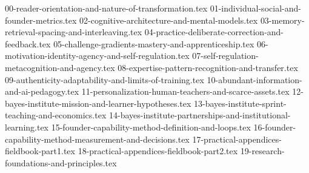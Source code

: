 
{00-reader-orientation-and-nature-of-transformation.tex}
{01-individual-social-and-founder-metrics.tex}
{02-cognitive-architecture-and-mental-models.tex}
{03-memory-retrieval-spacing-and-interleaving.tex}
{04-practice-deliberate-correction-and-feedback.tex}
{05-challenge-gradients-mastery-and-apprenticeship.tex}
{06-motivation-identity-agency-and-self-regulation.tex}
{07-self-regulation-metacognition-and-agency.tex}
{08-expertise-pattern-recognition-and-transfer.tex}
{09-authenticity-adaptability-and-limits-of-training.tex}
{10-abundant-information-and-ai-pedagogy.tex}
{11-personalization-human-teachers-and-scarce-assets.tex}
{12-bayes-institute-mission-and-learner-hypotheses.tex}
{13-bayes-institute-sprint-teaching-and-economics.tex}
{14-bayes-institute-partnerships-and-institutional-learning.tex}
{15-founder-capability-method-definition-and-loops.tex}
{16-founder-capability-method-measurement-and-decisions.tex}
{17-practical-appendices-fieldbook-part1.tex}
{18-practical-appendices-fieldbook-part2.tex}
{19-research-foundations-and-principles.tex}
